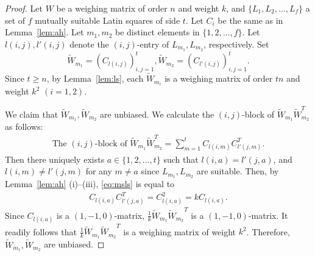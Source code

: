 \documentclass[10pt,a4paper]{amsart}
\begin{document}
\begin{proof}
Let $W$ be a weighing matrix of order $n$ and weight $k$, and
$\{L_1,L_2,\ldots,L_f\}$ a set of $f$ mutually suitable Latin squares
of side $t$.
Let $C_i$ be the same as in Lemma~\ref{lem:ah}. 
Let $m_1,m_2$ be distinct elements in $\{1,2,\ldots,f\}$. 
Let $l(i,j),l'(i,j)$ denote the $(i,j)$-entry of $L_{m_1},L_{m_2}$, respectively. 
Set 
\[
\widetilde{W}_{m_1}=(C_{l(i,j)})_{i,j=1}^t, \widetilde{W}_{m_2}=(C_{l'(i,j)})_{i,j=1}^t.
\] 
Since $t\geq n$,
by Lemma~\ref{lem:ls}, each $\widetilde{W}_{m_i}$ is a weighing matrix of order $tn$ and weight $k^2$
$(i=1,2)$. 

We claim that $\widetilde{W}_{m_1},\widetilde{W}_{m_2}$ are unbiased. 
We calculate the $(i,j)$-block of $\widetilde{W}_{m_1} \widetilde{W}_{m_2}^T$ as follows:
\begin{align}\label{eq:msls}
\text{The $(i,j)$-block of }\widetilde{W}_{m_1}\widetilde{W}_{m_2}^T
=\sum_{m=1}^t C_{l(i,m)}C^T_{l'(j,m)}.
\end{align}
Then there uniquely exists $a\in\{1,2,\ldots,t\}$ such that $l(i,a)=l'(j,a)$,  
and $l(i,m)\neq l'(j,m)$ for any $m\neq a$ since $L_{m_1},L_{m_2}$ are suitable. 
Then, by Lemma~\ref{lem:ah} (i)--(iii), \eqref{eq:msls} is equal to
\begin{align*}
C_{l(i,a)}C^T_{l'(j,a)}=C_{l(i,a)}^2=kC_{l(i,a)}.
\end{align*}
Since $C_{l(i,a)}$ is a $(1,-1,0)$-matrix,
$\frac{1}{k}\widetilde{W}_{m_1}{\widetilde{W}_{m_2}}^T$ is a $(1,-1,0)$-matrix. It
readily follows that $\frac{1}{k}\widetilde{W}_{m_1}{\widetilde{W}_{m_2}}^T$ is a
weighing matrix of weight $k^2$. Therefore,
$\widetilde{W}_{m_1},{\widetilde{W}_{m_2}}$ are unbiased.
\end{proof}
\end{document}
